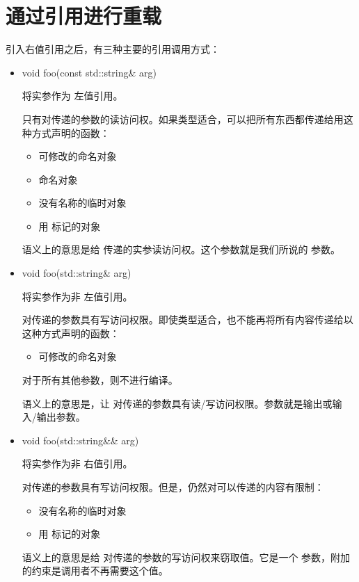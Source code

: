 \section{通过引用进行重载}
引入右值引用之后，有三种主要的引用调用方式：

\begin{itemize}
	\item \begin{cppcode}
void foo(const std::string\& arg)
\end{cppcode}
	将实参作为  左值引用。

	只有对传递的参数的读访问权。如果类型适合，可以把所有东西都传递给用这种方式声明的函数：

	\begin{itemize}
		\item 可修改的命名对象
		\item {} 命名对象
		\item 没有名称的临时对象
		\item 用  标记的对象
	\end{itemize}
	语义上的意思是给  传递的实参读访问权。这个参数就是我们所说的  参数。
	\item \begin{cppcode}
void foo(std::string\& arg)
\end{cppcode}
	将实参作为非  左值引用。

	对传递的参数具有写访问权限。即使类型适合，也不能再将所有内容传递给以这种方式声明的函数：

	\begin{itemize}
		\item 可修改的命名对象
	\end{itemize}
	对于所有其他参数，则不进行编译。

	语义上的意思是，让  对传递的参数具有读/写访问权限。参数就是输出或输入/输出参数。

	\item \begin{cppcode}
void foo(std::string\&\& arg)
\end{cppcode}
	将实参作为非  右值引用。

	对传递的参数具有写访问权限。但是，仍然对可以传递的内容有限制：

	\begin{itemize}
		\item 没有名称的临时对象
		\item 用  标记的对象
	\end{itemize}
	语义上的意思是给  对传递的参数的写访问权来窃取值。它是一个  参数，附加的约束是调用者不再需要这个值。
\end{itemize}

